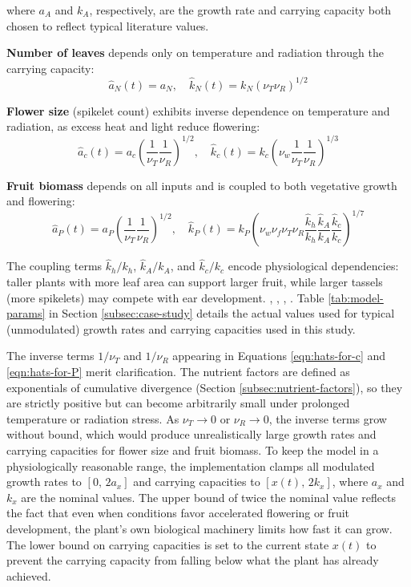 \documentclass[pdflatex,sn-mathphys-num]{sn-jnl}
\newcommand{\df}[2]{\displaystyle\frac{#1}{#2}}
\begin{document}
\noindent where $a_{A}$ and $k_{A}$, respectively, are the growth rate and carrying capacity both chosen to reflect typical literature values.

\textbf{Number of leaves} depends only on temperature and radiation through the carrying capacity:
\begin{equation}
\hat{a}_{N}(t) = a_{N}, \quad \hat{k}_{N}(t) = k_{N}(\nu_{T}\nu_{R})^{1/2}
\label{eqn:hats-for-N}
\end{equation}

\textbf{Flower size} (spikelet count) exhibits inverse dependence on temperature and radiation, as excess heat and light reduce flowering:
\begin{equation}
\hat{a}_{c}(t) = a_{c}\left(\df{1}{\nu_{T}}\df{1}{\nu_{R}}\right)^{1/2}, \quad \hat{k}_{c}(t) = k_{c}\left(\nu_{w}\df{1}{\nu_{T}}\df{1}{\nu_{R}}\right)^{1/3}
\label{eqn:hats-for-c}
\end{equation}

\textbf{Fruit biomass} depends on all inputs and is coupled to both vegetative growth and flowering:
\begin{equation}
\hat{a}_{P}(t) = a_{P}\left(\df{1}{\nu_{T}}\df{1}{\nu_{R}}\right)^{1/2}, \quad \hat{k}_{P}(t) = k_{P}\left(\nu_{w}\nu_{f}\nu_{T}\nu_{R}\df{\hat{k}_{h}}{k_{h}}\df{\hat{k}_{A}}{k_{A}}\df{\hat{k}_{c}}{k_{c}}\right)^{1/7}
\label{eqn:hats-for-P}
\end{equation}

The coupling terms $\hat{k}_{h}/k_{h}$, $\hat{k}_{A}/k_{A}$, and $\hat{k}_{c}/k_{c}$ encode physiological dependencies: taller plants with more leaf area can support larger fruit, while larger tassels (more spikelets) may compete with ear development. \cite{ren2022agronomic_traits_climate_maize_yield}, \cite{stubbs2023plant_height_maize_lodging}, \cite{wang2022maize_tassel_anther_pollen_genetics}, \cite{silveira2024adaptability_maize_tassel_yield}. Table \ref{tab:model-params} in Section \ref{subsec:case-study} details the actual values used for typical (unmodulated) growth rates and carrying capacities used in this study.

The inverse terms $1/\nu_T$ and $1/\nu_R$ appearing in Equations \ref{eqn:hats-for-c} and \ref{eqn:hats-for-P} merit clarification. The nutrient factors are defined as exponentials of cumulative divergence (Section \ref{subsec:nutrient-factors}), so they are strictly positive but can become arbitrarily small under prolonged temperature or radiation stress. As $\nu_T \to 0$ or $\nu_R \to 0$, the inverse terms grow without bound, which would produce unrealistically large growth rates and carrying capacities for flower size and fruit biomass. To keep the model in a physiologically reasonable range, the implementation clamps all modulated growth rates to $[0,\, 2a_x]$ and carrying capacities to $[x(t),\, 2k_x]$, where $a_x$ and $k_x$ are the nominal values. The upper bound of twice the nominal value reflects the fact that even when conditions favor accelerated flowering or fruit development, the plant's own biological machinery limits how fast it can grow. The lower bound on carrying capacities is set to the current state $x(t)$ to prevent the carrying capacity from falling below what the plant has already achieved.
\end{document}
